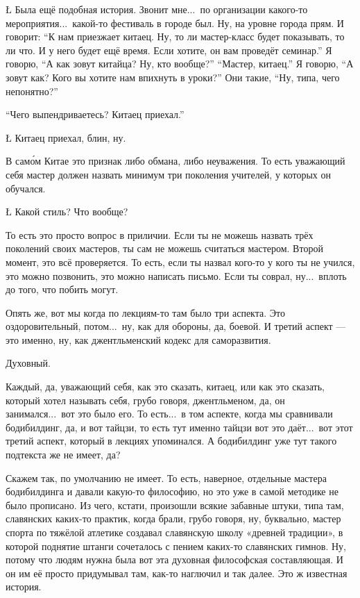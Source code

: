 \L
Была ещё подобная история.
Звонит мне...\
по организации какого-то мероприятия...\
какой-то фестиваль в городе был.
Ну, на уровне города прям.
И говорит: ``К нам приезжает
китаец. Ну, то ли
мастер-класс будет показывать, то ли что.
И у него будет ещё время.
Если хотите, он вам проведёт
семинар.'' Я говорю, ``А как зовут китайца?
Ну, кто вообще?''
``Мастер, китаец.''
Я говорю, ``А зовут как?
Кого вы хотите
нам впихнуть в уроки?''
Они такие, ``Ну,
типа, чего непонятно?''

\A
``Чего выпендриваетесь? Китаец приехал.''

\L
Китаец приехал, блин, ну.

\A
В сам\'ом Китае
это признак
либо обмана, либо
неуважения.
То есть уважающий себя мастер
должен назвать минимум
три поколения учителей, у которых он
обучался.

\L
Какой стиль? Что вообще?

\A
То есть это просто вопрос в приличии.
Если ты не можешь назвать трёх
поколений своих мастеров,
ты сам не можешь
считаться мастером.
Второй момент,
это всё проверяется.
То есть, если ты назвал кого-то у кого ты
не учился, это можно
позвонить, это можно написать письмо.
Если ты соврал, ну...\
вплоть до того, что побить могут.

\I
Опять же, вот мы когда по лекциям-то
там было три аспекта.
Это
оздоровительный, потом...\
ну, как для
обороны, да, боевой.
И третий аспект --- это
именно, ну, как
джентльменский
кодекс для саморазвития.

\A
Духовный.

\I
Каждый, да, уважающий
себя, как это сказать,
китаец, или как это сказать, который
хотел называть себя, грубо говоря,
джентльменом, да, он занимался...\
вот это
было его. То есть...\
в том аспекте,
когда мы сравнивали бодибилдинг,
да, и вот тайцзи, то есть
тут
именно тайцзи вот это даёт...\
вот этот третий
аспект, который в лекциях упоминался.
А бодибилдинг уже тут
такого подтекста же не имеет, да?

\A
Скажем так, по умолчанию
не имеет. То есть, наверное,
отдельные мастера бодибилдинга
и давали какую-то
философию, но это уже
в самой
методике не было прописано.
Из чего, кстати, произошли
всякие забавные штуки,
типа там, славянских
каких-то практик,
когда брали, грубо говоря,
ну, буквально,
мастер спорта по тяжёлой атлетике
создавал славянскую
школу
«древней традиции»,
в которой поднятие
штанги сочеталось с пением
каких-то славянских гимнов.
Ну, потому что
людям нужна была вот эта
духовная философская составляющая.
И он им её
просто придумывал
там, как-то
наглючил и так далее. Это ж известная
история.

